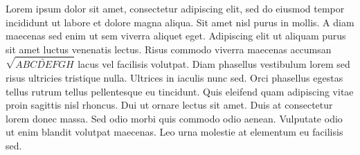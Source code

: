 Lorem ipsum dolor sit amet, consectetur adipiscing elit, sed do eiusmod tempor
incididunt ut labore et dolore magna aliqua. Sit amet nisl purus in mollis. A
diam maecenas sed enim ut sem viverra aliquet eget. Adipiscing elit ut aliquam
purus sit amet luctus venenatis lectus. Risus commodo viverra maecenas accumsan
$\sqrt{\widetilde{ABCDEFGH}}$ lacus vel facilisis volutpat. Diam phasellus vestibulum lorem sed risus
ultricies tristique nulla. Ultrices in iaculis nunc sed. Orci phasellus egestas
tellus rutrum tellus pellentesque eu tincidunt. Quis eleifend quam adipiscing
vitae proin sagittis nisl rhoncus. Dui ut ornare lectus sit amet. Duis at
consectetur lorem donec massa. Sed odio morbi quis commodo odio aenean.
Vulputate odio ut enim blandit volutpat maecenas. Leo urna molestie at
elementum eu facilisis sed.


\the\abovecaptionskip\\
\the\belowcaptionskip\\
\the\textfloatsep\\
\the\footins

\the\textwidth

\the\skip\footins

\the\baselineskip

\the\abovedisplayskip


\the\belowdisplayskip

\the\abovedisplayshortskip

\the\belowdisplayshortskip

